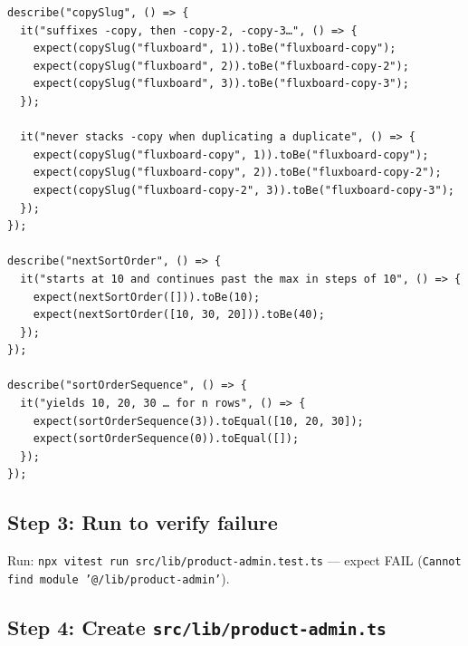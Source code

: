 \documentclass[11pt,a4paper]{article}
\begin{document}
\begin{lstlisting}
describe("copySlug", () => {
  it("suffixes -copy, then -copy-2, -copy-3…", () => {
    expect(copySlug("fluxboard", 1)).toBe("fluxboard-copy");
    expect(copySlug("fluxboard", 2)).toBe("fluxboard-copy-2");
    expect(copySlug("fluxboard", 3)).toBe("fluxboard-copy-3");
  });

  it("never stacks -copy when duplicating a duplicate", () => {
    expect(copySlug("fluxboard-copy", 1)).toBe("fluxboard-copy");
    expect(copySlug("fluxboard-copy", 2)).toBe("fluxboard-copy-2");
    expect(copySlug("fluxboard-copy-2", 3)).toBe("fluxboard-copy-3");
  });
});

describe("nextSortOrder", () => {
  it("starts at 10 and continues past the max in steps of 10", () => {
    expect(nextSortOrder([])).toBe(10);
    expect(nextSortOrder([10, 30, 20])).toBe(40);
  });
});

describe("sortOrderSequence", () => {
  it("yields 10, 20, 30 … for n rows", () => {
    expect(sortOrderSequence(3)).toEqual([10, 20, 30]);
    expect(sortOrderSequence(0)).toEqual([]);
  });
});
\end{lstlisting}

\subsection*{Step 3: Run to verify failure}

Run: \texttt{npx vitest run src/lib/product-admin.test.ts} --- expect FAIL
(\texttt{Cannot find module '@/lib/product-admin'}).

\subsection*{Step 4: Create \texttt{src/lib/product-admin.ts}}
\end{document}
